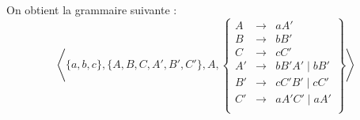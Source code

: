 \begin{corrections}
\begin{questions}
  \item On obtient la grammaire suivante :
    $$\left\langle \{a,b,c\}, \{A,B,C, A', B', C'\}, A,
    \left\{\begin{array}{rcl}
    A & \rightarrow & a A'\\
    B & \rightarrow & b B'\\
    C & \rightarrow & c C'\\
    A' & \rightarrow & b B'A' \mid b B' \\
    B' & \rightarrow & c C'B' \mid c C' \\
    C' & \rightarrow & a A'C' \mid a A' \\
    \end{array}\right\}\right\rangle$$

  \end{questions}

\end{corrections}

\endgroup
\endinput
